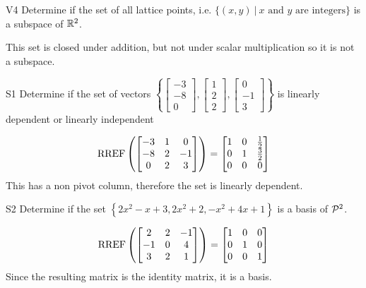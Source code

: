\documentclass{sbgLAsemi}
\begin{document}
\begin{problem}{V4}
Determine if the set of all lattice points, i.e. $\{(x,y)\ \big|\ \text{$x$ and $y$ are integers} \}$ is a subspace of $\IR^2$.
\end{problem}
\begin{solution}
This set is closed under addition, but not under scalar multiplication so it is not a subspace.
\end{solution}

\begin{problem}{S1}
Determine if the set of vectors $\left\{ \begin{bmatrix} -3 \\ -8 \\ 0 \end{bmatrix}, \begin{bmatrix} 1 \\ 2 \\ 2 \end{bmatrix}, \begin{bmatrix} 0 \\ -1 \\ 3 \end{bmatrix} \right\}$ is  linearly dependent or linearly independent
\end{problem}
\begin{solution}
$$\RREF\left( \begin{bmatrix}-3 & 1 & 0 \\ -8 & 2 & -1 \\ 0 & 2 & 3 \end{bmatrix}\right) = \begin{bmatrix} 1 & 0 & \frac{1}{2} \\ 0 & 1 & \frac{3}{2} \\ 0 & 0 & 0 \end{bmatrix}$$
This has a non pivot column, therefore the set is linearly dependent.
\end{solution}

\begin{problem}{S2}
  Determine if the set $\left\{ 2x^2-x+3, 2x^2+2, -x^2+4x+1 \right\}$
  is a basis of $\P^2$.
\end{problem}
\begin{solution}
  \[\RREF\left(
    \begin{bmatrix}
      2 & 2 & -1 \\
      -1 & 0 & 4 \\
      3 & 2 & 1
    \end{bmatrix} \right)= \begin{bmatrix}
      1 & 0 &0 \\
      0 & 1 & 0 \\
      0 & 0 & 1
    \end{bmatrix}
  \]
Since the resulting matrix is the identity matrix, it is a basis.
\end{solution}
\end{document}
